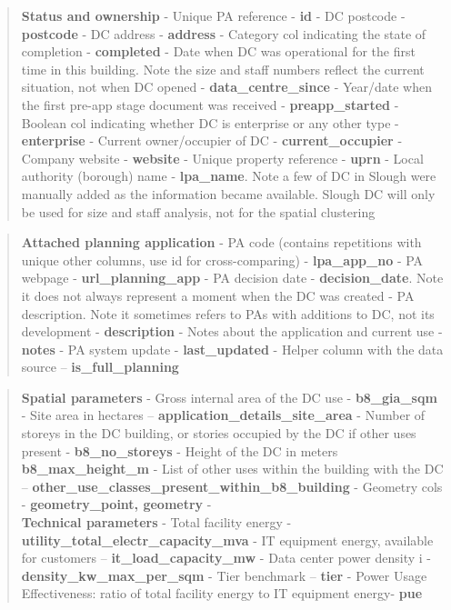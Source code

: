 \documentclass[11pt]{article}
\begin{document}
\begin{quote}
\textbf{Status and ownership} - Unique PA reference - \textbf{id} - DC
postcode - \textbf{postcode} - DC address - \textbf{address} - Category
col indicating the state of completion - \textbf{completed} - Date when
DC was operational for the first time in this building. Note the size
and staff numbers reflect the current situation, not when DC opened -
\textbf{data\_centre\_since} - Year/date when the first pre-app stage
document was received - \textbf{preapp\_started} - Boolean col
indicating whether DC is enterprise or any other type -
\textbf{enterprise} - Current owner/occupier of DC -
\textbf{current\_occupier} - Company website - \textbf{website} - Unique
property reference - \textbf{uprn} - Local authority (borough) name -
\textbf{lpa\_name}. Note a few of DC in Slough were manually added as
the information became available. Slough DC will only be used for size
and staff analysis, not for the spatial clustering
\end{quote}

\begin{quote}
\textbf{Attached planning application} - PA code (contains repetitions
with unique other columns, use id for cross-comparing) -
\textbf{lpa\_app\_no} - PA webpage - \textbf{url\_planning\_app} - PA
decision date - \textbf{decision\_date}. Note it does not always
represent a moment when the DC was created - PA description. Note it
sometimes refers to PAs with additions to DC, not its development -
\textbf{description} - Notes about the application and current use -
\textbf{notes} - PA system update - \textbf{last\_updated} - Helper
column with the data source -- \textbf{is\_full\_planning}
\end{quote}

\begin{quote}
\textbf{Spatial parameters} - Gross internal area of the DC use -
\textbf{b8\_gia\_sqm} - Site area in hectares --
\textbf{application\_details\_site\_area} - Number of storeys in the DC
building, or stories occupied by the DC if other uses present -
\textbf{b8\_no\_storeys} - Height of the DC in meters
\textbf{b8\_max\_height\_m} - List of other uses within the building
with the DC --
\textbf{other\_use\_classes\_present\_within\_b8\_building} - Geometry
cols - \textbf{geometry\_point, geometry} -\\
\textbf{Technical parameters} - Total facility energy -
\textbf{utility\_total\_electr\_capacity\_mva} - IT equipment energy,
available for customers -- \textbf{it\_load\_capacity\_mw} - Data center
power density i - \textbf{density\_kw\_max\_per\_sqm} - Tier benchmark
-- \textbf{tier} - Power Usage Effectiveness: ratio of total facility
energy to IT equipment energy- \textbf{pue}
\end{quote}
\end{document}
